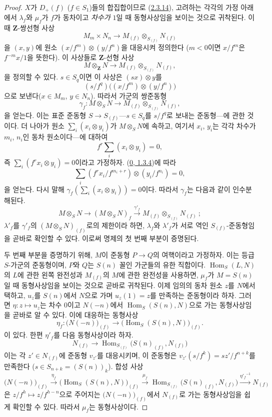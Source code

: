 \begin{proof}
$X$가 $D_+(f)$ ($f\in S_1$)들의 합집합이므로
(\hyperref[II.2.3.14-ko]{2.3.14}), 고려하는 각각의 가정 아래에서
$\lambda_f$와 $\mu_f$가 $f$가 동차이고 \emph{차수가 $1$}일 때
동형사상임을 보이는 것으로 귀착된다. 이때 $\mathbf{Z}$-쌍선형 사상
\[
  M_m\times N_n\longrightarrow
  M_{(f)}\otimes_{S_{(f)}}N_{(f)}
\]
을 $(x,y)$에 원소 $(x/f^m)\otimes(y/f^n)$을 대응시켜 정의한다
($m<0$이면 $x/f^m$은 $f^{-m}x/1$을 뜻한다). 이 사상들로
$\mathbf{Z}$-선형 사상
\[
  M\otimes_{\mathbf{Z}}N\longrightarrow
  M_{(f)}\otimes_{S_{(f)}}N_{(f)},
\]
을 정의할 수 있다. $s\in S_q$이면 이 사상은 $(sx)\otimes y$를
\[
  (s/f^q)\bigl((x/f^m)\otimes(y/f^n)\bigr)
\]
으로 보낸다($x\in M_m$, $y\in N_n$). 따라서 가군의 쌍준동형
\[
  \gamma_f:M\otimes_S N\longrightarrow
  M_{(f)}\otimes_{S_{(f)}}N_{(f)},
\]
을 얻는다. 이는 표준 준동형 $S\to S_{(f)}$---$s\in S_q$를
$s/f^q$로 보내는 준동형---에 관한 것이다. 더 나아가 원소
$\sum_i(x_i\otimes y_i)$가 $M\otimes_S N$에 속하고, 여기서
$x_i$, $y_i$는 각각 차수가
$m_i$, $n_i$인 동차 원소이다---에 대하여
\[
  f^r\sum_i(x_i\otimes y_i)=0,
\]
즉 $\sum_i(f^rx_i\otimes y_i)=0$이라고 가정하자.
(\hyperref[0.1.3.4-ko]{0, 1.3.4})에 따라
\[
  \sum_i(f^rx_i/f^{m_i+r})\otimes(y_i/f^{n_i})=0,
\]
을 얻는다. 다시 말해 $\gamma_f(\sum_i(x_i\otimes y_i))=0$이다. 따라서
$\gamma_f$는 다음과 같이 인수분해된다.
\[
  M\otimes_S N\longrightarrow(M\otimes_S N)_f
  \xrightarrow{\gamma'_f}
  M_{(f)}\otimes_{S_{(f)}}N_{(f)}~;
\]
$\lambda'_f$를 $\gamma'_f$의
$(M\otimes_S N)_{(f)}$로의 제한이라 하면,
$\lambda_f$와 $\lambda'_f$가 서로 역인 $S_{(f)}$-준동형임을 곧바로
확인할 수 있다. 이로써 명제의 첫 번째 부분이 증명된다.

두 번째 부분을 증명하기 위해, $M$이 준동형 $P\to Q$의 여핵이라고
가정하자. 이는 등급 $S$-가군의 준동형이며, $P$와 $Q$는 $S(n)$ 꼴인
가군들의 유한 직합이다. $\operatorname{Hom}_S(L,N)$의 $L$에 관한
왼쪽 완전성과 $M_{(f)}$의 $M$에 관한 완전성을 사용하면, $\mu_f$가
$M=S(n)$일 때 동형사상임을 보이는 것으로 곧바로 귀착된다. 이제 임의의
동차 원소 $z$를 $N$에서 택하고, $u_z$를 $S(n)$에서 $N$으로 가며
$u_z(1)=z$를 만족하는 준동형이라 하자. 그러면
$\eta:z\mapsto u_z$는 차수 $0$이고 $N(-n)$에서
$\operatorname{Hom}_S(S(n),N)$으로 가는 동형사상임을 곧바로
알 수 있다. 이에 대응하는 동형사상
\[
  \eta_f:\bigl(N(-n)\bigr)_{(f)}
  \longrightarrow
  \bigl(\operatorname{Hom}_S(S(n),N)\bigr)_{(f)}.
\]
이 있다. 한편 $\eta'_f$를 다음 동형사상이라 하자.
\[
  N_{(f)}\longrightarrow
  \operatorname{Hom}_{S_{(f)}}\bigl(S(n)_{(f)},N_{(f)}\bigr)
\]
이는 각 $z'\in N_{(f)}$에 준동형 $v_{z'}$를 대응시키며, 이 준동형은
$v_{z'}(s/f^k)=sz'/f^{n+k}$를 만족한다
($s\in S_{n+k}=(S(n))_k$). 합성 사상
\[
  \bigl(N(-n)\bigr)_{(f)}
  \xrightarrow{\eta_f}
  \bigl(\operatorname{Hom}_S(S(n),N)\bigr)_{(f)}
  \xrightarrow{\mu_f}
  \operatorname{Hom}_{S_{(f)}}\bigl(S(n)_{(f)},N_{(f)}\bigr)
  \xrightarrow{{\eta'_f}^{-1}}N_{(f)}
\]
은 $z/f^h\mapsto z/f^{h-n}$으로 주어지는
$\bigl(N(-n)\bigr)_{(f)}$에서 $N_{(f)}$로 가는 동형사상임을 쉽게 확인할 수
있다. 따라서 $\mu_f$는 동형사상이다.
\end{proof}

